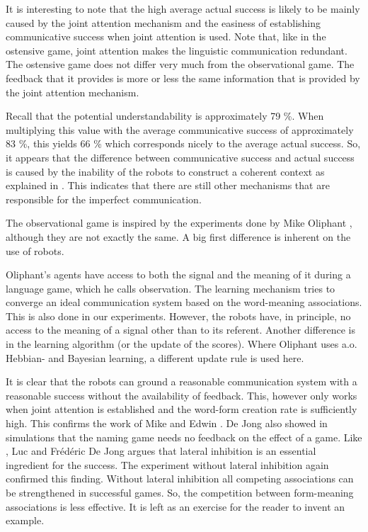 It is interesting to note that the high average actual success is likely to be mainly caused by the joint attention mechanism and the easiness of establishing communicative success when joint attention is used. Note that, like in the ostensive game, joint attention makes the linguistic communication redundant. The ostensive game does not differ very much from the observational game. The feedback that it provides is more or less the same information that is provided by the joint attention mechanism.

Recall that the potential understandability is approximately 79 \%. When multiplying this value with the average communicative success of approximately 83 \%, this yields 66 \% which corresponds nicely to the average actual success. So, it appears that the difference between communicative success and actual success is caused by the inability of the robots to construct a coherent context as explained in . This indicates that there are still other mechanisms that are responsible for the imperfect communication.


The observational game is inspired by the experiments done by Mike Oliphant \citep{oliphant:1997,oliphant:1998,oliphant:2000}, although they are not exactly the same. A big first difference is inherent on the use of robots. 

Oliphant's agents have access to both the signal and the meaning of it during a language game, which he calls observation. The learning mechanism tries to converge an ideal communication system based on the word-meaning associations. This is also done in our experiments. However, the robots have, in principle, no access to the meaning of a signal other than to its referent. Another difference is in the learning algorithm (or the update of the scores). Where Oliphant uses a.o. Hebbian- and Bayesian learning, a different update rule is used here.

It is clear that the robots can ground a reasonable communication system with a reasonable success without the availability of feedback. This, however only works when joint attention is established and the word-form creation rate is sufficiently high. This confirms the work of Mike \citet{oliphant:1997} and Edwin \citet{dejong:2000}. De Jong also showed in simulations that the naming game needs no feedback on the effect of a game. Like \citet{oliphant:1997}, Luc \citet{steels:2000} and Fr\'ed\'eric \citet{kaplan:2000} De Jong argues that lateral inhibition is an essential ingredient for the success. The experiment without lateral inhibition again confirmed this finding. Without lateral inhibition all competing associations can be strengthened in successful games. So, the competition between form-meaning associations is less effective. It is left as an exercise for the reader to invent an example.

